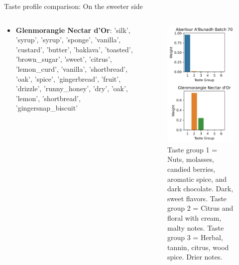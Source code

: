\documentclass{beamer}
\begin{document}
\begin{frame}{Taste profile comparison: On the sweeter side}
\begin{columns}
\begin{column}{0.4\textwidth}
\begin{itemize}
				\item \textbf{Glenmorangie Nectar d'Or}: 'silk', 'syrup', 'syrup', 'sponge', 'vanilla', 'custard', 'butter', 'baklava', 'toasted', 'brown\_sugar', 'sweet', 'citrus', 'lemon\_curd', 'vanilla', 'shortbread', 'oak', 'spice', 'gingerbread', 'fruit', 'drizzle', 'runny\_honey', 'dry', 'oak', 'lemon', 'shortbread', 'gingersnap\_biscuit'
			\end{itemize}
		\end{column}
		\begin{column}{0.6\textwidth}
			\begin{figure}[H]
				\begin{center}
					\includegraphics[scale = 0.5]{sweetsidetopics}
					\caption{ Taste group 1 = Nuts, molasses, candied berries, aromatic spice, and dark chocolate. Dark, sweet flavors. Taste group 2 = Citrus and floral with cream, malty notes. Taste group 3 = Herbal, tannin, citrus, wood spice. Drier notes.}
				\end{center}
			\end{figure}
		\end{column}
		

\end{columns}
\end{frame}
\end{document}
